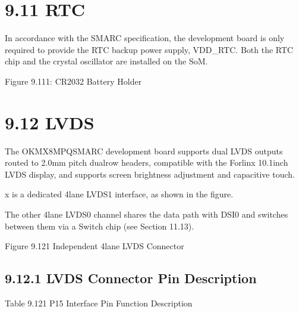 \documentclass[letterpaper,10pt,openany,english]{sphinxmanual}
\begin{document}
\section{9.11 RTC}
\label{\detokenize{hardware:id28}}
\sphinxAtStartPar
In accordance with the SMARC specification, the development board is only required to provide the RTC backup power supply, VDD\_RTC. Both the RTC chip and the crystal oscillator are installed on the SoM.

\sphinxAtStartPar
{}

\sphinxAtStartPar
Figure 9.11\sphinxhyphen{}1: CR2032 Battery Holder


\section{9.12 LVDS}
\label{\detokenize{hardware:lvds}}
\sphinxAtStartPar
The OK\sphinxhyphen{}MX8MPQ\sphinxhyphen{}SMARC development board supports dual LVDS outputs routed to 2.0mm pitch dual\sphinxhyphen{}row headers, compatible with the Forlinx 10.1\sphinxhyphen{}inch LVDS display, and supports screen brightness adjustment and capacitive touch.

 x is a dedicated 4\sphinxhyphen{}lane LVDS1 interface, as shown in the figure.

\sphinxAtStartPar
The other 4\sphinxhyphen{}lane LVDS0 channel shares the data path with DSI0 and switches between them via a Switch chip (see Section 11.13).

\sphinxAtStartPar
{}

\sphinxAtStartPar
Figure 9.12\sphinxhyphen{}1 Independent 4\sphinxhyphen{}lane LVDS Connector


\subsection{9.12.1 LVDS Connector Pin Description}
\label{\detokenize{hardware:lvds-connector-pin-description}}
\sphinxAtStartPar
Table 9.12\sphinxhyphen{}1 P15 Interface Pin Function Description
\end{document}
